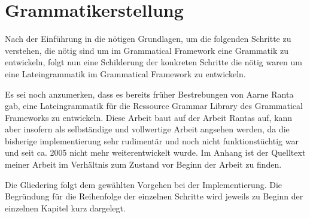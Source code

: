 \documentclass[12pt,abstract=on,titlepage,bibliography=totoc,ngerman,listof=totoc]{scrreprt}
\begin{document}
\chapter{Grammatikerstellung}
\label{chap:grammatik}
Nach der Einführung in die nötigen Grundlagen, um die folgenden Schritte zu verstehen, die nötig sind um im Grammatical Framework eine Grammatik zu entwickeln, folgt nun eine Schilderung der konkreten Schritte die nötig waren um eine Lateingrammatik im Grammatical Framework zu entwickeln. \par
Es sei noch anzumerken, dass es bereits früher Bestrebungen von Aarne Ranta gab, eine Lateingrammatik für die Ressource Grammar Library des Grammatical Frameworks zu entwickeln. Diese Arbeit baut auf der Arbeit Rantas auf, kann aber insofern als selbständige und vollwertige Arbeit angsehen werden, da die bisherige implementierung sehr rudimentär und noch nicht funktionstüchtig war und seit ca. 2005 nicht mehr weiterentwickelt wurde. Im Anhang ist der Quelltext meiner Arbeit im Verhältnis zum Zustand vor Beginn der Arbeit zu finden. \par
Die Gliedering folgt dem gewählten Vorgehen bei der Implementierung. Die Begründung für die Reihenfolge der einzelnen Schritte wird jeweils zu Beginn der einzelnen Kapitel kurz dargelegt.
\pagebreak
\end{document}
